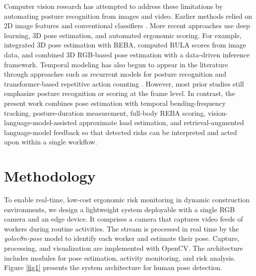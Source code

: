 \documentclass[11pt]{article}
\begin{document}
Computer vision research has attempted to address these limitations by automating posture recognition from images and video. Earlier methods relied on 2D image features and conventional classifiers \citep{yan2017development,seo2021automated}. More recent approaches use deep learning, 3D pose estimation, and automated ergonomic scoring. For example, \citet{yu2019joint} integrated 3D pose estimation with REBA, \citet{massirisfernandez2020ergonomic} computed RULA scores from image data, and \citet{li2024data} combined 3D RGB-based pose estimation with a data-driven inference framework. Temporal modeling has also begun to appear in the literature through approaches such as recurrent models for posture recognition and transformer-based repetitive action counting \citep{zhao2021applying,wang20233d,chen2024automatic}. However, most prior studies still emphasize posture recognition or scoring at the frame level. In contrast, the present work combines pose estimation with temporal bending-frequency tracking, posture-duration measurement, full-body REBA scoring, vision-language-model-assisted approximate load estimation, and retrieval-augmented language-model feedback so that detected risks can be interpreted and acted upon within a single workflow.

\section{Methodology}

To enable real-time, low-cost ergonomic risk monitoring in dynamic construction environments, we design a lightweight system deployable with a single RGB camera and an edge device. It comprises a camera that captures video feeds of workers during routine activities. The stream is processed in real time by   the \textit{yolov8n-pose} model  to identify each worker and estimate their pose. Capture, processing, and visualization are implemented with OpenCV. The architecture includes modules for pose estimation, activity monitoring, and risk analysis. Figure \ref{fig1} presents the system architecture for human pose detection. 

\end{document}
